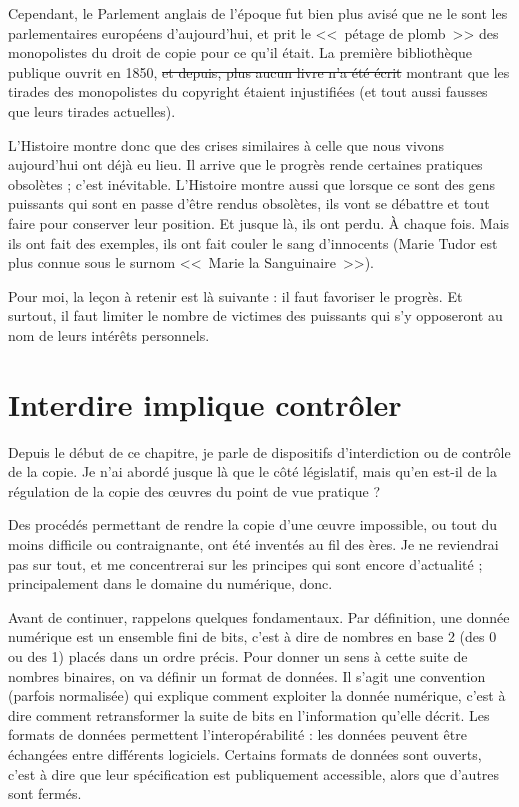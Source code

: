 Cependant, le Parlement anglais de l'époque fut bien plus avisé que ne le sont les parlementaires européens d'aujourd'hui, et prit le <<~pétage de plomb~>> des monopolistes du droit de copie pour ce qu'il était. 
La première bibliothèque publique ouvrit en 1850, \sout{et depuis, plus aucun livre n'a été écrit} montrant que les tirades des monopolistes du copyright étaient injustifiées (et tout aussi fausses que leurs tirades actuelles).

L'Histoire montre donc que des crises similaires à celle que nous vivons aujourd'hui ont déjà eu lieu.
Il arrive que le progrès rende certaines pratiques obsolètes ; c'est inévitable.
L'Histoire montre aussi que lorsque ce sont des gens puissants qui sont en passe d'être rendus obsolètes, ils vont se débattre et tout faire pour conserver leur position.
Et jusque là, ils ont perdu.
À chaque fois.
Mais ils ont fait des exemples, ils ont fait couler le sang d'innocents (Marie Tudor est plus connue sous le surnom <<~Marie la Sanguinaire~>>).

Pour moi, la leçon à retenir est là suivante : il faut favoriser le progrès.
Et surtout, il faut limiter le nombre de victimes des puissants qui s'y opposeront au nom de leurs intérêts personnels.

\section{Interdire implique contrôler} %
\label{drm}

Depuis le début de ce chapitre, je parle de dispositifs d'interdiction ou de contrôle de la copie.
Je n'ai abordé jusque là que le côté législatif, mais qu'en est-il de la régulation de la copie des œuvres du point de vue pratique ?

Des procédés permettant de rendre la copie d'une œuvre impossible, ou tout du moins difficile ou contraignante, ont été inventés au fil des ères.
Je ne reviendrai pas sur tout, et me concentrerai sur les principes qui sont encore d'actualité ; principalement dans le domaine du numérique, donc.

Avant de continuer, rappelons quelques fondamentaux.
Par définition, une donnée numérique est un ensemble fini de bits, c'est à dire de nombres en base 2 (des 0 ou des 1) placés dans un ordre précis.
Pour donner un sens à cette suite de nombres binaires, on va définir un format de données.
Il s'agit une convention (parfois normalisée) qui explique comment exploiter la donnée numérique, c'est à dire comment retransformer la suite de bits en l'information qu'elle décrit.
Les formats de données permettent l'interopérabilité : les données peuvent être échangées entre différents logiciels.
Certains formats de données sont ouverts, c'est à dire que leur spécification est publiquement accessible, alors que d'autres sont fermés.

